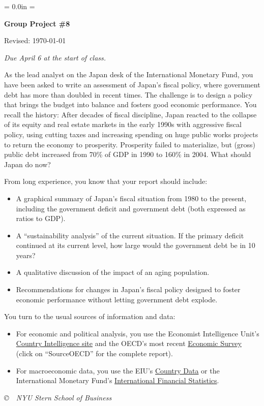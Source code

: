 \documentclass[letterpaper,12pt]{article}
\def\HeadName{Group Project \#8}
\begin{document}
\parindent = 0.0in
\parskip = \bigskipamount
\thispagestyle{empty}%
\Head

\centerline{\large \bf \HeadName}%
\centerline{Revised:  \today}

\medskip
{\it Due April 6 at the start of class. }
\medskip

As the lead analyst on the  Japan desk of the International Monetary Fund, 
you have been asked to write an assessment of Japan's fiscal policy, where 
government debt has more than doubled in recent times.   
The challenge is to design a policy that  
brings the budget into balance and fosters good economic performance.  
You recall the history:  
After decades of fiscal discipline, Japan reacted to the collapse 
of its equity and real estate markets in the early 1990s with 
aggressive fiscal policy,   
using cutting taxes and increasing spending on huge public works projects 
to return the economy to prosperity.  
Prosperity failed to materialize, but (gross) public debt increased from 
70\% of GDP in 1990 to 160\% in 2004. 
What should Japan do now? 

From long experience, you know that your report should include:  
%
\begin{itemize}
\item A graphical summary of Japan's fiscal situation 
from 1980 to the present, 
including the government deficit and government debt (both expressed 
as ratios to GDP).  

\item A ``sustainability analysis'' of the current situation.  
If the primary deficit continued at its current level, how large would 
the government debt be in 10 years?  

\item A qualitative discussion of the impact of an aging population.  

\item Recommendations for changes in Japan's fiscal policy 
designed to foster economic performance without letting 
government debt explode.   

\end{itemize}
%
You turn to the usual sources of information and data:  
%
\begin{itemize}
\item For economic and political analysis, 
you use the Economist Intelligence Unit's
\href{http://db.eiu.com/index.asp?layout=publicationTypes}{Country Intelligence site} 
and the OECD's most recent 
\href{http://www.oecd.org/document/61/0,2340,en_2649_22054704_34274621_1_1_1_1,00.html}
{Economic Survey} (click on ``SourceOECD'' for the complete report).  

\item For macroeconomic data, you use the EIU's
\href{http://www.countrydata.bvdep.com/cgi/template.dll?product=101&user=ipaddress}{Country Data}
or the International Monetary Fund's
\href{http://ifs.apdi.net/imf/ifsbrowser.aspx?branch=ROOT}{International Financial Statistics}.

\end{itemize}

\vfill \centerline{\it \copyright \ \number\year \ NYU Stern School of Business}
\end{document}
